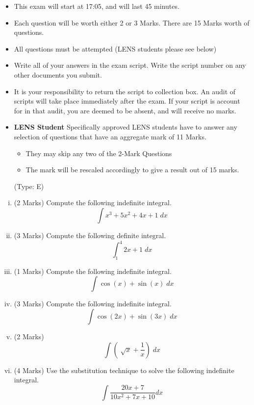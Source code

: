 \documentclass[11pt]{article} %
\begin{document}
	\begin{itemize} 
		\item This exam will start at 17:05, and will last 45 minutes.
		
		\item Each question will be worth either 2 or 3 Marks. There are 15 Marks worth of questions.
		\item All questions must be attempted (LENS students please see below)
		
		\item Write all of your answers in the exam script. Write the script number on any other documents you submit.
		
		\item It is your responsibility to return the script to collection box. An audit of scripts will take place immediately after the exam. If your script is account for in that audit,  you are deemed to be absent, and will receive no marks.
		
		\item \textbf{LENS Student}
		Specifically approved LENS students have to answer any selection of questions that have an aggregate mark of 11 Marks.  
		\begin{itemize}
			\item They may skip any two of the 2-Mark Questions
			\item The mark will be rescaled accordingly to give a result out of 15 marks.
		\end{itemize}
		(Type: E)		
		
	\end{itemize}
\newpage
\begin{enumerate}[(i)]
	\item (2 Marks) Compute the following indefinite integral.
		\[ \int x^3 + 5x^2+ 4x + 1 \; dx \]
	\item (3 Marks) Compute the following definite integral.
	\[ \int^{4}_{1} 2x + 1 \; dx \]
	
\newpage	
	\item (1 Marks) Compute the following indefinite integral.
		\[ \int \cos(x)  + \sin(x) \; dx \]
	\item (3 Marks) Compute the following indefinite integral.
			\[ \int \cos(2x)  + \sin(3x) \; dx \]

\newpage
	\item (2 Marks)
{\Large	\[  \int \left( \;\sqrt{x} + \frac{1}{x} \right) \; dx\]
}
\newpage	


	\item (4 Marks) Use the substitution technique to solve the following indefinite integral.
		\[  \int  \frac{20x+7}{10x^2+7x +10}  dx\]
\end{enumerate}

\end{document}
